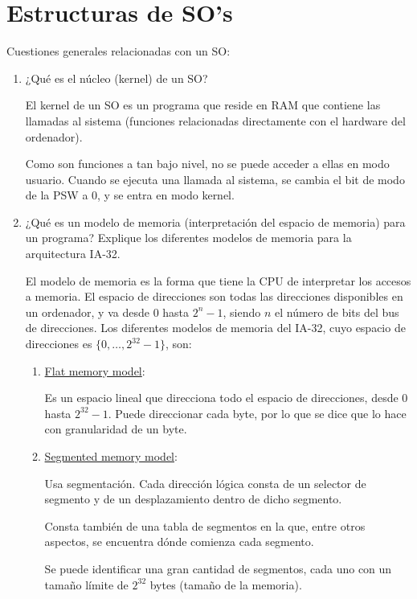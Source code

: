 \section{Estructuras de SO's}

\begin{ejercicio}
    Cuestiones generales relacionadas con un SO:
    \begin{enumerate}
        \item ¿Qué es el núcleo (kernel) de un SO?

        El kernel de un SO es un programa que reside en RAM que contiene las llamadas al sistema (funciones relacionadas directamente con el hardware del ordenador).
        
        Como son funciones a tan bajo nivel, no se puede acceder a ellas en modo usuario. Cuando se ejecuta una llamada al sistema, se cambia el bit de modo de la PSW a 0, y se entra en modo kernel.
        
        \item ¿Qué es un modelo de memoria (interpretación del espacio de memoria) para un programa? Explique los diferentes modelos de memoria para la arquitectura IA-32.

        El modelo de memoria es la forma que tiene la CPU de interpretar los accesos a memoria. El espacio de direcciones son todas las direcciones disponibles en un ordenador, y va desde $0$ hasta $2^n-1$, siendo $n$ el número de bits del bus de direcciones. Los diferentes modelos de memoria del IA-32, cuyo espacio de direcciones es $\{0,\dots,2^{32}-1\}$, son:
        \begin{enumerate}
            \item \ul{Flat memory model}:

            Es un espacio lineal que direcciona todo el espacio de direcciones, desde $0$ hasta $2^{32}-1$. Puede direccionar cada byte, por lo que se dice que lo hace con granularidad de un byte.

            \item\ul{Segmented memory model}:

            Usa segmentación. Cada dirección lógica consta de un selector de segmento y de un desplazamiento dentro de dicho segmento.

            Consta también de una tabla de segmentos en la que, entre otros aspectos, se encuentra dónde comienza cada segmento.

            Se puede identificar una gran cantidad de segmentos, cada uno con un tamaño límite de $2^{32}$ bytes (tamaño de la memoria).


\end{enumerate}
\end{enumerate}
\end{ejercicio}
